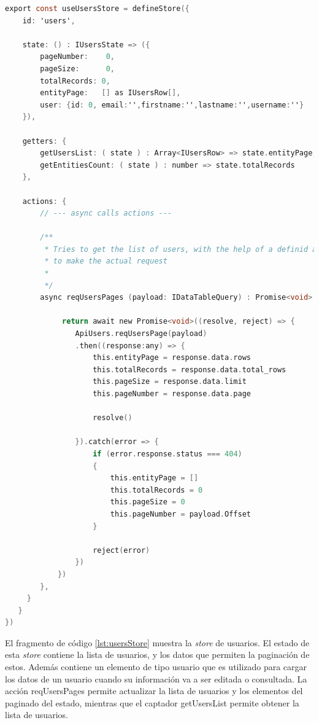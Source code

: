\begin{lstlisting}[language=C,caption={Store de usuarios}, label={lst:usersStore}]
export const useUsersStore = defineStore({
    id: 'users',

    state: () : IUsersState => ({
        pageNumber:    0,
        pageSize:      0,
        totalRecords: 0,
        entityPage:   [] as IUsersRow[],
        user: {id: 0, email:'',firstname:'',lastname:'',username:''} 
    }),

    getters: {
        getUsersList: ( state ) : Array<IUsersRow> => state.entityPage,
        getEntitiesCount: ( state ) : number => state.totalRecords
    },

    actions: {
        // --- async calls actions ---

        /**
         * Tries to get the list of users, with the help of a definid axios apis
         * to make the actual request
         *
         */
        async reqUsersPages (payload: IDataTableQuery) : Promise<void> {

             return await new Promise<void>((resolve, reject) => {
                ApiUsers.reqUsersPage(payload)
                .then((response:any) => {
                    this.entityPage = response.data.rows                  
                    this.totalRecords = response.data.total_rows
                    this.pageSize = response.data.limit
                    this.pageNumber = response.data.page
                    
                    resolve()

                }).catch(error => {
                    if (error.response.status === 404)
                    {
                        this.entityPage = []
                        this.totalRecords = 0
                        this.pageSize = 0
                        this.pageNumber = payload.Offset
                    }

                    reject(error)
                })
            })
        },
     }
   }
})
\end{lstlisting}

El fragmento de código \ref{lst:usersStore} muestra la \textit{store} de usuarios. El estado de esta \textit{store} contiene la lista de usuarios, y los datos que permiten la paginación de estos. Además contiene un elemento de tipo usuario que es utilizado para cargar los datos de un usuario cuando su información va a ser editada o consultada. La acción reqUsersPages permite actualizar la lista de usuarios y los elementos del paginado del estado, mientras que el captador getUsersList permite obtener la lista de usuarios.

